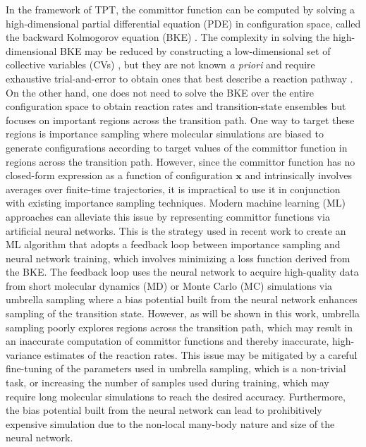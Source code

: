 \documentclass{article}
\numberwithin{equation}{section}
\def\*#1{\mathbf{#1}}
\theoremstyle{definition}
\theoremstyle{remark}
\begin{document}
In the framework of TPT, the committor function can be computed by solving a high-dimensional partial differential equation (PDE) in configuration space, called the backward Kolmogorov equation (BKE) \cite{weinan2006towards,vanden2010transition,onsager1938ions}. 
The complexity in solving the high-dimensional BKE may be reduced by constructing a low-dimensional set of collective variables (CVs) \cite{maragliano2006}, but they are not known \textit{a priori} and require exhaustive trial-and-error to obtain ones that best describe a reaction pathway \cite{peters2016}. 
On the other hand, one does not need to solve the BKE over the entire configuration space to obtain reaction rates and transition-state ensembles but focuses on important regions across the transition path.
One way to target these regions is importance sampling \cite{frenkel2001understanding} where molecular simulations are biased to generate configurations according to target values of the committor function in regions across the transition path.
However, since the committor function has no closed-form expression as a function of configuration $ \* x $ and intrinsically involves 
averages over finite-time trajectories, it is impractical to use it in conjunction with existing importance sampling techniques. 
Modern machine learning (ML) approaches can alleviate this issue by representing committor functions via artificial neural networks.
This is the strategy used in recent work \cite{rotskoff2020learning} to create an ML algorithm that adopts a feedback loop between importance sampling and neural network training, which involves minimizing a loss function derived from the BKE. 
The feedback loop uses the neural network to acquire high-quality data from short molecular dynamics (MD) or Monte Carlo (MC) simulations via umbrella sampling \cite{torrie1977nonphysical} where a bias potential built from the neural network enhances sampling of the transition state. 
However, as will be shown in this work, umbrella sampling poorly explores regions across the transition path, which may result in an inaccurate computation of committor functions and thereby inaccurate, high-variance estimates of the reaction rates. 
This issue may be mitigated by a careful fine-tuning of the parameters used in umbrella sampling, which is a non-trivial task, or increasing the number of samples used during training, which may require long molecular simulations to reach the desired accuracy. 
Furthermore, the bias potential built from the neural network can lead to prohibitively expensive simulation due to the non-local many-body nature and size of the neural network.
\end{document}
